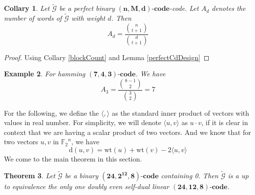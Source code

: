 \documentclass{article}
\newtheorem{theorem}{Theorem}[section]
\newtheorem{example}[theorem]{Example}
\newtheorem{collary}[theorem]{Collary}
\numberwithin{equation}{theorem}
\numberwithin{figure}{theorem}
\newcommand{\cCodes}{\ensuremath{\widetilde{\mathscr{G}}}}
\newcommand{\code}[3]{\ensuremath{\bm{(#1,#2,#3)\mbox{-}code}}}
\newcommand{\linearCode}[3]{\ensuremath{\bm{(#1,#2,#3)\mbox{-}code}}}
\newcommand{\ftwoN}[1]{\ensuremath{\mathbb{F}_2}^{#1}}
\newcommand{\wt}[1]{\ensuremath{\text{wt}(#1)}}
\newcommand{\dist}[2]{\ensuremath{\text{d}(#1,#2)}}
\begin{document}
\begin{collary}\label{perfectCodeAd}
Let {\cCodes} be a perfect binary \code{n}{M}{d}-code. Let $A_d$ denotes the number of words of {\cCodes} with weight $d$. Then
\[
	A_d = \frac{\binom{n}{t+1}}{\binom{d}{t+1}}
\]
\end{collary}
\begin{proof}
	Using Collary \ref{blockCount}  and Lemma \ref{perfectCdDesign}
\end{proof}
\begin{example}
For hamming \linearCode{7}{4}{3}. We have
\[
	A_3 = \frac{\binom{8-1}{2}}{\binom{3}{2}} = 7
\]
\end{example}
For the following, we define the $\langle , \rangle$ as the standard inner product of vectors with values in real number. 
For simplicity, we will denote $\langle u,v \rangle$ as $u \cdot v$, if it is clear in context that we are having a scalar product of two vectors. And we know that for two vectors $u,v$ in $\ftwoN{n}$, we have
\begin{equation}\label{distWeightEqn}
	\dist{u}{v} = \wt{u} + \wt{v} - 2\langle u, v\rangle 
\end{equation}
We come to the main theorem in this section.
\begin{theorem}
Let {\cCodes} be a binary {\code{24}{2^{12}}{8}} containing 0. Then {\cCodes} is a up to equivalence the only one doubly even self-dual linear {\linearCode{24}{12}{8}}. 
\end{theorem}
\end{document}
